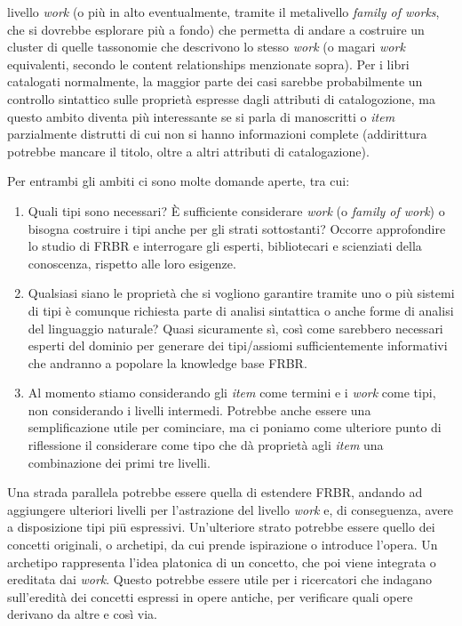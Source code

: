 \begin{itemize}
    livello \emph{work} (o più in alto eventualmente, tramite il metalivello \emph{family of works}, che si dovrebbe esplorare più a fondo) che permetta di andare a 
    costruire un cluster di quelle tassonomie che descrivono lo stesso \emph{work} (o magari \emph{work} equivalenti, secondo le content relationships menzionate sopra). 
    Per i libri catalogati normalmente, la maggior parte dei casi sarebbe probabilmente un controllo sintattico sulle proprietà espresse dagli attributi di 
    catalogozione, ma questo ambito diventa più interessante se si parla di manoscritti o \emph{item} parzialmente distrutti di cui non si hanno informazioni 
    complete (addirittura potrebbe mancare il titolo, oltre a altri attributi di catalogazione).
\end{itemize}
Per entrambi gli ambiti ci sono molte domande aperte, tra cui:
\begin{enumerate}
    \item Quali tipi sono necessari? È sufficiente considerare \emph{work} (o \emph{family of work}) o bisogna costruire i tipi anche per gli strati sottostanti? Occorre 
    approfondire lo studio di FRBR e interrogare gli esperti, bibliotecari e scienziati della conoscenza, rispetto alle loro esigenze.
    \item Qualsiasi siano le proprietà che si vogliono garantire tramite uno o più sistemi di tipi è comunque richiesta parte di analisi sintattica o anche 
    forme di analisi del linguaggio naturale? Quasi sicuramente sì, così come sarebbero necessari esperti del dominio per generare dei tipi/assiomi 
    sufficientemente informativi che andranno a popolare la knowledge base FRBR.
    \item Al momento stiamo considerando gli \emph{item} come termini e i \emph{work} come tipi, non considerando i livelli intermedi. Potrebbe anche essere una 
    semplificazione utile per cominciare, ma ci poniamo come ulteriore punto di riflessione il considerare come tipo che dà proprietà agli \emph{item} una 
    combinazione dei primi tre livelli.
\end{enumerate}

Una strada parallela potrebbe essere quella di estendere FRBR, andando ad aggiungere ulteriori livelli per l'astrazione del livello \emph{work} e, di conseguenza, 
avere a disposizione tipi piū espressivi. Un'ulteriore strato potrebbe essere quello dei concetti originali, o archetipi, da cui prende ispirazione o 
introduce l'opera. Un archetipo rappresenta l'idea platonica di un concetto, che poi viene integrata o ereditata dai \emph{work}. Questo potrebbe essere utile 
per i ricercatori che indagano sull'eredità dei concetti espressi in opere antiche, per verificare quali opere derivano da altre e così via.

